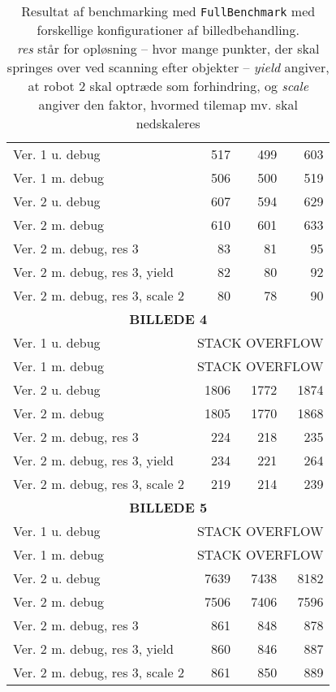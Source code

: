 \begin{table}[!hp]
\begin{center}
\begin{tabular}{l | r r r}
		\hline
		Ver. 1 u. debug & 517 & 499 & 603 \\
		Ver. 1 m. debug & 506 & 500 & 519 \\
		Ver. 2 u. debug & 607 & 594 & 629 \\
		Ver. 2 m. debug & 610 & 601 & 633 \\
		Ver. 2 m. debug, res 3 & 83 & 81 & 95 \\
		Ver. 2 m. debug, res 3, yield & 82 & 80 & 92 \\
		Ver. 2 m. debug, res 3, scale 2 & 80 & 78 & 90 \\
		\hline
		\multicolumn{4}{c}{\textbf{BILLEDE 4}}\\
		\hline
		Ver. 1 u. debug & \multicolumn{3}{c}{STACK OVERFLOW} \\
		Ver. 1 m. debug & \multicolumn{3}{c}{STACK OVERFLOW} \\
		Ver. 2 u. debug & 1806 & 1772 & 1874 \\
		Ver. 2 m. debug & 1805 & 1770 & 1868 \\
		Ver. 2 m. debug, res 3 & 224 & 218 & 235 \\
		Ver. 2 m. debug, res 3, yield & 234 & 221 & 264 \\
		Ver. 2 m. debug, res 3, scale 2 & 219 & 214 & 239 \\
		\hline
		\multicolumn{4}{c}{\textbf{BILLEDE 5}}\\
		\hline
		Ver. 1 u. debug & \multicolumn{3}{c}{STACK OVERFLOW} \\
		Ver. 1 m. debug & \multicolumn{3}{c}{STACK OVERFLOW} \\
		Ver. 2 u. debug & 7639 & 7438 & 8182 \\
		Ver. 2 m. debug & 7506 & 7406 & 7596 \\
		Ver. 2 m. debug, res 3 & 861 & 848 & 878 \\
		Ver. 2 m. debug, res 3, yield & 860 & 846 & 887 \\
		Ver. 2 m. debug, res 3, scale 2 & 861 & 850 & 889 \\
	\end{tabular}
	\caption{Resultat af benchmarking med \texttt{FullBenchmark} med forskellige konfigurationer af billedbehandling.\\
	\scriptsize{\textit{res} står for opløsning -- hvor mange punkter, der skal springes over ved scanning efter objekter -- \textit{yield} angiver, at robot 2 skal optræde som forhindring, og \textit{scale} angiver den faktor, hvormed tilemap mv. skal nedskaleres}}\label{tab:ip-test-performance}
	\end{center}
\end{table}

